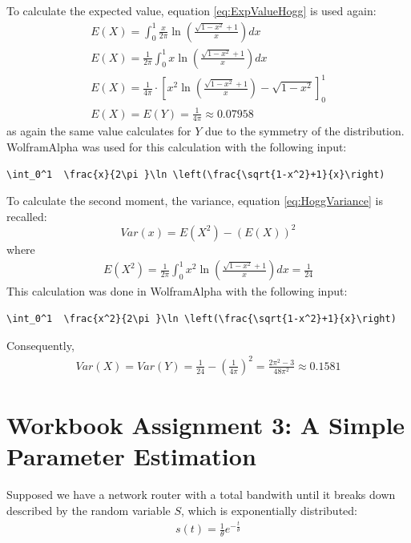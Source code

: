 To calculate the expected value, equation \eqref{eq:ExpValueHogg} is used again:
\begin{equation}
\begin{split}
E(X) = \int_0^1  \frac{x}{2\pi }\ln \left(\frac{\sqrt{1-x^2}+1}{x}\right) dx\\
E(X) = \frac{1}{2\pi}\int_0^1  x\ln \left(\frac{\sqrt{1-x^2}+1}{x}\right) dx\\
E(X) = \frac{1}{4\pi } \cdot \left[x^2\ln \left(\frac{\sqrt{1-x^2}+1}{x}\right)-\sqrt{1-x^2}\right]_0^1\\
E(X) = E(Y) = \frac{1}{4\pi} \approx 0.07958
\end{split}
\label{eq:expvalF_X}
\end{equation}
as again the same value calculates for $Y$ due to the symmetry of the distribution.
WolframAlpha \cite{wolfalph} was used for this calculation with the following input:
\begin{lstlisting}
\int_0^1  \frac{x}{2\pi }\ln \left(\frac{\sqrt{1-x^2}+1}{x}\right)
\end{lstlisting}

To calculate the second moment, the variance, equation \eqref{eq:HoggVariance} is recalled:
\[
Var(x) = E(X^2)-(E(X))^2
\]
where
\begin{equation}
\begin{split}
E(X^2) =  \frac{1}{2\pi}\int_0^1  x^2\ln \left(\frac{\sqrt{1-x^2}+1}{x}\right) dx = \frac{1}{24}
\end{split}
\label{eq:E(X^2)}
\end{equation}
This calculation was done in WolframAlpha \cite{wolfalph} with the following input:
\begin{lstlisting}
\int_0^1  \frac{x^2}{2\pi }\ln \left(\frac{\sqrt{1-x^2}+1}{x}\right)
\end{lstlisting}
Consequently, 
\begin{equation}
\begin{split}
Var(X) = Var(Y) = \frac{1}{24}- \left(\frac{1}{4\pi}\right)^2 = \frac{2\pi ^2-3}{48\pi ^2} \approx 0.1581
\end{split}
\label{eq:VarXcalculated}
\end{equation}



\chapter{Workbook Assignment 3: A Simple Parameter Estimation}	

Supposed we have a network router with a total bandwith until it breaks down described by the random variable $S$, which is exponentially distributed:
\begin{equation}
\begin{split}
s(t) =  \frac{1}{\theta} e^{-\frac{t}{\theta}}
\end{split}
\label{eq:exphardwarefailure}
\end{equation}


